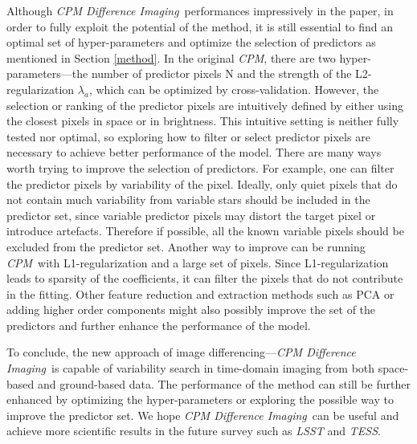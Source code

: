 \documentclass[12pt, preprint]{aastex}
\newcommand{\project}[1]{\textsl{#1}}
\newcommand{\cpm}{\project{CPM}}
\newcommand{\cpmdiff}{\project{CPM Difference Imaging}}
\begin{document}
Although \cpmdiff\ performances impressively in the paper,  in order to fully exploit the potential of the method, it is still essential to find an optimal set of hyper-parameters and optimize the selection of predictors as mentioned in Section \ref{method}. 
In the original \cpm, there are two hyper-parameters---the number of predictor pixels N and the strength of the L2-regularization $\lambda_a$, which can be optimized by cross-validation. 
However, the selection or ranking of the predictor pixels are intuitively defined by either using the closest pixels in space or in brightness.
This intuitive setting is neither fully tested nor optimal, so exploring how to filter or select predictor pixels are necessary to achieve better performance of the model.
There are many ways worth trying to improve the selection of predictors.
For example, one can filter the predictor pixels by variability of the pixel.
Ideally, only quiet pixels that do not contain much variability from variable stars should be included in the predictor set, since variable predictor pixels may distort the target pixel or introduce artefacts.
Therefore if possible, all the known variable pixels should be excluded from the predictor set. 
Another way to improve can be running \cpm\ with L1-regularization and a large set of pixels. 
Since L1-regularization leads to sparsity of the coefficients, it can filter the pixels that do not contribute in the fitting. 
Other feature reduction and extraction methods such as PCA or adding higher order components might also possibly improve the set of the predictors and further enhance the performance of the model. 

To conclude, the new approach of image differencing---\cpmdiff\ is capable of variability search in time-domain imaging from both space-based and ground-based data.
The performance of the method can still be further enhanced by optimizing the hyper-parameters or exploring the possible way to improve the predictor set.
We hope \cpmdiff\ can be useful and achieve more scientific results in the future survey such as \project{LSST} and \project{TESS}.


\clearpage

\clearpage
\end{document}
